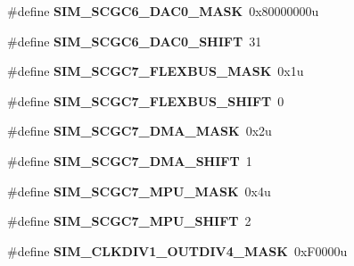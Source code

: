 \begin{DoxyCompactItemize}
\item 
\#define {\bfseries S\+I\+M\+\_\+\+S\+C\+G\+C6\+\_\+\+D\+A\+C0\+\_\+\+M\+A\+SK}~0x80000000u\hypertarget{group__SIM__Register__Masks_ga67d96adcce9fece065ce6a7f57f495a1}{}\label{group__SIM__Register__Masks_ga67d96adcce9fece065ce6a7f57f495a1}

\item 
\#define {\bfseries S\+I\+M\+\_\+\+S\+C\+G\+C6\+\_\+\+D\+A\+C0\+\_\+\+S\+H\+I\+FT}~31\hypertarget{group__SIM__Register__Masks_ga263123e8c1970021957fa8e72cf4a25a}{}\label{group__SIM__Register__Masks_ga263123e8c1970021957fa8e72cf4a25a}

\item 
\#define {\bfseries S\+I\+M\+\_\+\+S\+C\+G\+C7\+\_\+\+F\+L\+E\+X\+B\+U\+S\+\_\+\+M\+A\+SK}~0x1u\hypertarget{group__SIM__Register__Masks_ga93f819afb387ad8aa57896e43ab0e795}{}\label{group__SIM__Register__Masks_ga93f819afb387ad8aa57896e43ab0e795}

\item 
\#define {\bfseries S\+I\+M\+\_\+\+S\+C\+G\+C7\+\_\+\+F\+L\+E\+X\+B\+U\+S\+\_\+\+S\+H\+I\+FT}~0\hypertarget{group__SIM__Register__Masks_ga624734f9006b5f488a9e1f789e1e3bde}{}\label{group__SIM__Register__Masks_ga624734f9006b5f488a9e1f789e1e3bde}

\item 
\#define {\bfseries S\+I\+M\+\_\+\+S\+C\+G\+C7\+\_\+\+D\+M\+A\+\_\+\+M\+A\+SK}~0x2u\hypertarget{group__SIM__Register__Masks_gac559e129885604991932101719e3b368}{}\label{group__SIM__Register__Masks_gac559e129885604991932101719e3b368}

\item 
\#define {\bfseries S\+I\+M\+\_\+\+S\+C\+G\+C7\+\_\+\+D\+M\+A\+\_\+\+S\+H\+I\+FT}~1\hypertarget{group__SIM__Register__Masks_ga1113f1622eb2e4099653e93943a89c6e}{}\label{group__SIM__Register__Masks_ga1113f1622eb2e4099653e93943a89c6e}

\item 
\#define {\bfseries S\+I\+M\+\_\+\+S\+C\+G\+C7\+\_\+\+M\+P\+U\+\_\+\+M\+A\+SK}~0x4u\hypertarget{group__SIM__Register__Masks_ga10319f9b82c284e2b8c0dbe633a8cc47}{}\label{group__SIM__Register__Masks_ga10319f9b82c284e2b8c0dbe633a8cc47}

\item 
\#define {\bfseries S\+I\+M\+\_\+\+S\+C\+G\+C7\+\_\+\+M\+P\+U\+\_\+\+S\+H\+I\+FT}~2\hypertarget{group__SIM__Register__Masks_ga6e29c9922d73e340397f527f22dccd97}{}\label{group__SIM__Register__Masks_ga6e29c9922d73e340397f527f22dccd97}

\item 
\#define {\bfseries S\+I\+M\+\_\+\+C\+L\+K\+D\+I\+V1\+\_\+\+O\+U\+T\+D\+I\+V4\+\_\+\+M\+A\+SK}~0x\+F0000u\hypertarget{group__SIM__Register__Masks_gaa2a972171bb5a662e1b4993b042f7180}{}\label{group__SIM__Register__Masks_gaa2a972171bb5a662e1b4993b042f7180}


\end{DoxyCompactItemize}
